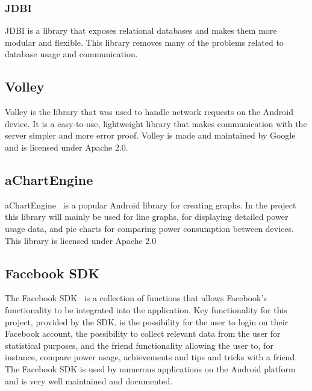 \subsubsection{JDBI}
JDBI is a library that exposes relational databases and makes them more modular and flexible. This library removes many of the problems related to database usage and communication.

\subsection{Volley}
Volley is the library that was used to handle network requests on the Android device. It is a easy-to-use, lightweight library that makes communication with the server 
simpler and more error proof.  Volley is made and maintained by Google and is licensed under Apache 2.0.

\subsection{aChartEngine}
aChartEngine~\cite{achart} is a popular Android library for creating graphs. In the project this library will mainly be used for line graphs, for displaying detailed power 
usage data, and pie charts for comparing power consumption between devices. This library is licensed under Apache 2.0

\subsection{Facebook SDK}
The Facebook SDK~\cite{fsdk} is a collection of functions that allows Facebook’s functionality to be integrated into the application. Key functionality for this project, 
provided by the SDK, is the possibility for the user to login on their Facebook account, the possibility to collect relevant data from the user for statistical purposes, and the 
friend functionality allowing the user to, for instance, compare power usage, achievements and tips and tricks with a friend. The Facebook SDK is used by numerous applications 
on the Android platform and is very well maintained and documented. 
